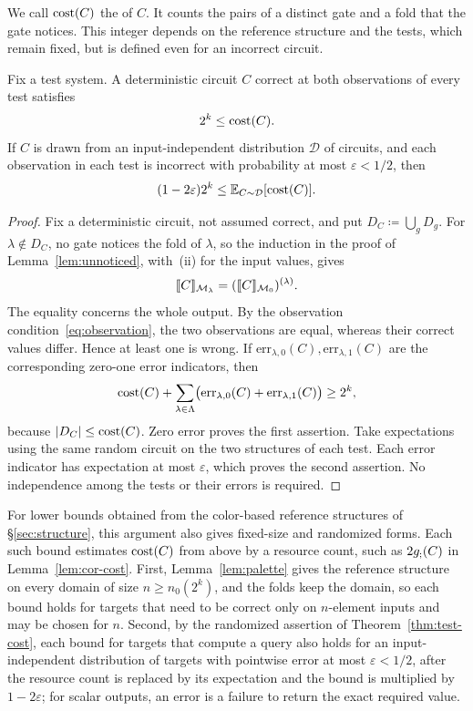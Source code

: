 We call $\operatorname{cost}(C)$ the  of $C$. It counts the pairs of a
distinct gate and a fold that the gate notices. This integer depends on
the reference structure and the tests, which remain fixed, but is
defined even for an incorrect circuit.

\begin{theorem}\label{thm:test-cost}
Fix a test system. A deterministic circuit $C$ correct at both
observations of every test satisfies
\[
 2^k\le\operatorname{cost}(C).
\]
If $C$ is drawn from an input-independent distribution $\mathcal D$ of
circuits, and each observation in each test is incorrect with probability
at most $\varepsilon<1/2$, then
\[
 (1-2\varepsilon)2^k\le
 \mathbb E_{C\sim\mathcal D}[\operatorname{cost}(C)].
\]
\end{theorem}
\begin{proof}
Fix a deterministic circuit, not assumed correct, and put
$D_C\coloneqq\bigcup_gD_g$. For $\lambda\notin D_C$, no gate notices the
fold of $\lambda$, so the induction in the proof of
Lemma~\ref{lem:unnoticed}, with~(ii) for the input values, gives
\[
 \llbracket C\rrbracket_{\mathcal M_\lambda}=(\llbracket C\rrbracket_{\mathcal M_0})^{(\lambda)}.
\]
The equality concerns the whole output. By the observation
condition~\eqref{eq:observation}, the two observations are equal, whereas
their correct values differ. Hence at least one is wrong. If
$\mathrm{err}_{\lambda,0}(C),\mathrm{err}_{\lambda,1}(C)$ are the
corresponding zero-one error indicators, then
\[
 \operatorname{cost}(C)+\sum_{\lambda\in\Lambda}
   \bigl(\mathrm{err}_{\lambda,0}(C)+\mathrm{err}_{\lambda,1}(C)\bigr)\ge2^k,
\]
because $|D_C|\le\operatorname{cost}(C)$. Zero error proves the first assertion.
Take expectations using the same random circuit on the two structures
of each test. Each error indicator has expectation at most $\varepsilon$,
which proves the second assertion. No independence among the tests or
their errors is required.
\end{proof}

For lower bounds obtained from the color-based reference structures
of \S\ref{sec:structure}, this argument also gives fixed-size and
randomized forms. Each such bound estimates $\operatorname{cost}(C)$ from above by
a resource count, such as $2g_{;}(C)$ in Lemma~\ref{lem:cor-cost}. First, Lemma~\ref{lem:palette} gives the
reference structure on every domain of size $n\ge n_0(2^k)$, and the
folds keep the domain, so each bound holds for targets that need to be
correct only on $n$-element inputs and may be chosen for $n$. Second, by
the randomized assertion of Theorem~\ref{thm:test-cost}, each bound for
targets that compute a query also holds for an input-independent
distribution of targets with pointwise error at most
$\varepsilon<1/2$, after the resource count is replaced by its
expectation and the bound is multiplied by $1-2\varepsilon$; for scalar
outputs, an error is a failure to return the exact required value.

